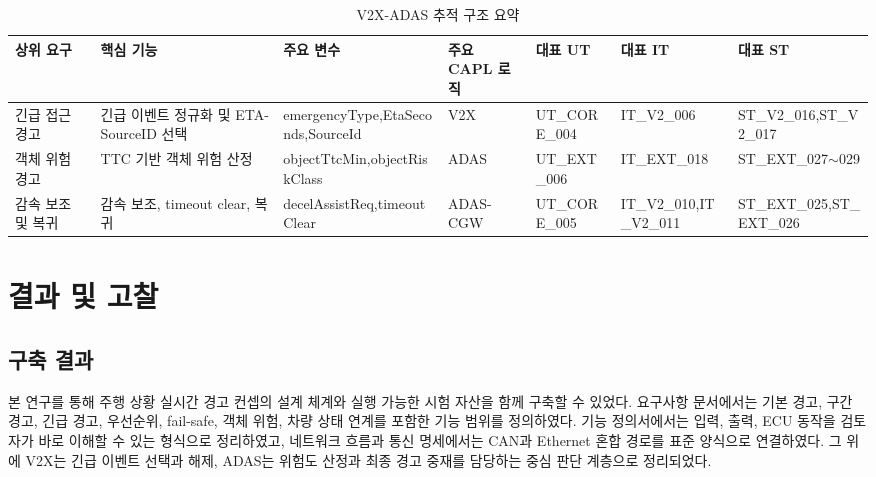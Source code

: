 \documentclass[10pt,a4paper,twocolumn]{article}
\begin{document}
\begin{table}[t]
\caption{V2X-ADAS 추적 구조 요약}
\label{tab:traceability}
\centering
\footnotesize
\setlength{\tabcolsep}{4pt}
\begin{tabularx}{\textwidth}{>{\raggedright\arraybackslash}p{2.2cm} >{\raggedright\arraybackslash}p{2.7cm} >{\raggedright\arraybackslash}p{3.2cm} >{\raggedright\arraybackslash}p{2.1cm} >{\raggedright\arraybackslash}p{1.9cm} >{\raggedright\arraybackslash}p{1.9cm} >{\raggedright\arraybackslash}X}
\toprule
상위 요구 & 핵심 기능 & 주요 변수 & 주요 CAPL 로직 & 대표 UT & 대표 IT & 대표 ST \\
\midrule
긴급 접근 경고 & 긴급 이벤트 정규화 및 ETA-SourceID 선택 & emergencyType,\newline EtaSeconds,\newline SourceId & V2X & UT\_CORE\_004 & IT\_V2\_006 & ST\_V2\_016,\newline ST\_V2\_017 \\
객체 위험 경고 & TTC 기반 객체 위험 산정 & objectTtcMin,\newline objectRiskClass & ADAS & UT\_EXT\_006 & IT\_EXT\_018 & ST\_EXT\_027$\sim$029 \\
감속 보조 및 복귀 & 감속 보조, timeout clear, 복귀 & decelAssistReq,\newline timeoutClear & ADAS-CGW & UT\_CORE\_005 & IT\_V2\_010,\newline IT\_V2\_011 & ST\_EXT\_025,\newline ST\_EXT\_026 \\
\bottomrule
\end{tabularx}
\end{table}

\section{결과 및 고찰}

\subsection{구축 결과}

본 연구를 통해 주행 상황 실시간 경고 컨셉의 설계 체계와 실행 가능한 시험 자산을 함께 구축할 수 있었다. 요구사항 문서에서는 기본 경고, 구간 경고, 긴급 경고, 우선순위, fail-safe, 객체 위험, 차량 상태 연계를 포함한 기능 범위를 정의하였다. 기능 정의서에서는 입력, 출력, ECU 동작을 검토자가 바로 이해할 수 있는 형식으로 정리하였고, 네트워크 흐름과 통신 명세에서는 CAN과 Ethernet 혼합 경로를 표준 양식으로 연결하였다. 그 위에 V2X는 긴급 이벤트 선택과 해제, ADAS는 위험도 산정과 최종 경고 중재를 담당하는 중심 판단 계층으로 정리되었다.
\end{document}

